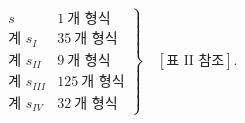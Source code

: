 
\[
\left.
\begin{array}{lr}
s&1\ \text{개 형식}\\
\text{계 }s_I&35\ \text{개 형식}\\
\text{계 }s_{II}&9\ \text{개 형식}\\
\text{계 }s_{III}&125\ \text{개 형식}\\
\text{계 }s_{IV}&32\ \text{개 형식}
\end{array}
\right\}
\quad [\text{표 II 참조}].
\]
